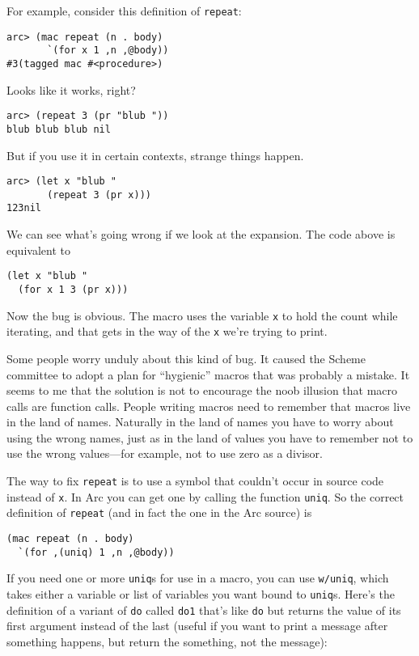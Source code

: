 \documentclass[a4paper,12pt]{book}
\begin{document}
For example, consider this definition of \verb|repeat|:

\begin{verbatim}
arc> (mac repeat (n . body)
       `(for x 1 ,n ,@body))
#3(tagged mac #<procedure>)
\end{verbatim}

Looks like it works, right?

\begin{verbatim}
arc> (repeat 3 (pr "blub ")) 
blub blub blub nil
\end{verbatim}

But if you use it in certain contexts, strange things happen.

\begin{verbatim}
arc> (let x "blub "  
       (repeat 3 (pr x)))
123nil
\end{verbatim}

We can see what's going wrong if we look at the expansion.  The
code above is equivalent to

\begin{verbatim}
(let x "blub "
  (for x 1 3 (pr x)))
\end{verbatim}

Now the bug is obvious.  The macro uses the variable {\tt{}x} to hold the
count while iterating, and that gets in the way of the {\tt{}x} we're
trying to print.

Some people worry unduly about this kind of bug.  It caused the
{\sc{}Scheme} committee to adopt a plan for ``hygienic'' macros that was
probably a mistake.  It seems to me that the solution is not to
encourage the noob illusion that macro calls are function calls.
People writing macros need to remember that macros live in the land
of names.  Naturally in the land of names you have to worry about
using the wrong names, just as in the land of values you have to
remember not to use the wrong values---for example, not to use zero
as a divisor.

The way to fix \verb|repeat| is to use a symbol that couldn't occur in
source code instead of {\tt{}x}.  In {\sc{}Arc} you can get one by calling the
function \verb|uniq|.  So the correct definition of \verb|repeat| (and in fact
the one in the {\sc{}Arc} source) is

\begin{verbatim}
(mac repeat (n . body)
  `(for ,(uniq) 1 ,n ,@body))
\end{verbatim}

If you need one or more \verb|uniq|s for use in a macro, you can use \verb|w/uniq|, 
which takes either a variable or list of variables you want bound to
\verb|uniq|s.  Here's the definition of a variant of \verb|do| called \verb|do1| that's
like \verb|do| but returns the value of its first argument instead of the
last (useful if you want to print a message after something happens, 
but return the something, not the message):
\end{document}
